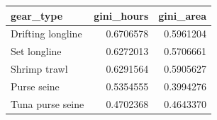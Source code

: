
\begin{tabular}{lrr}
\toprule
gear\_type & gini\_hours & gini\_area\\
\midrule
Drifting longline & 0.6706578 & 0.5961204\\
Set longline & 0.6272013 & 0.5706661\\
Shrimp trawl & 0.6291564 & 0.5905627\\
Purse seine & 0.5354555 & 0.3994276\\
Tuna purse seine & 0.4702368 & 0.4643370\\
\bottomrule
\end{tabular}
